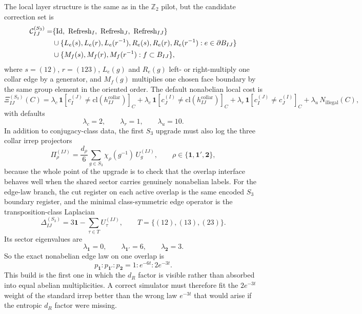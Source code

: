 \documentclass[11pt]{article}
\begin{document}
The local layer structure is the same as in the $\mathbb Z_2$ pilot, but the candidate correction
set is
\begin{align}
\mathcal C_{IJ}^{(S_3)}
=&
\{\mathrm{Id},\ \mathrm{Refresh}_I,\ \mathrm{Refresh}_J,\ \mathrm{Refresh}_{IJ}\}\notag\\
&\cup
\{L_e(s),L_e(r),L_e(r^{-1}),R_e(s),R_e(r),R_e(r^{-1}) : e\in \partial B_{IJ}\}\notag\\
&\cup
\{M_f(s),M_f(r),M_f(r^{-1}) : f\subset B_{IJ}\},
\end{align}
where $s=(12)$, $r=(123)$, $L_e(g)$ and $R_e(g)$ left- or right-multiply one collar edge by a
generator, and $M_f(g)$ multiplies one chosen face boundary by the same group element in the
oriented order. The default nonabelian local cost is
\begin{equation}
\Xi_{IJ}^{(S_3)}(C)
=
\lambda_c\,\mathbf 1[c_I^{(J)}\neq \mathrm{cl}(h_{IJ}^{\mathrm{collar}})]_C
+
\lambda_c\,\mathbf 1[c_J^{(I)}\neq \mathrm{cl}(h_{IJ}^{\mathrm{collar}})]_C
+
\lambda_r\,\mathbf 1[c_I^{(J)}\neq c_J^{(I)}]_C
+
\lambda_u\,N_{\mathrm{illegal}}(C),
\end{equation}
with defaults
\begin{equation}
\lambda_c=2,\qquad \lambda_r=1,\qquad \lambda_u=10.
\end{equation}
In addition to conjugacy-class data, the first $S_3$ upgrade must also log the three collar
irrep projectors
\begin{equation}
\Pi_{\rho}^{(IJ)}
=
\frac{d_{\rho}}{6}\sum_{g\in S_3}\chi_{\rho}(g^{-1})\,U_g^{(IJ)},
\qquad
\rho\in\{\mathbf 1,\mathbf 1',\mathbf 2\},
\end{equation}
because the whole point of the upgrade is to check that the overlap interface behaves well
when the shared sector carries genuinely nonabelian labels.
For the edge-law branch, the cut register on each active overlap is the same encoded $S_3$
boundary register, and the minimal class-symmetric edge operator is the transposition-class
Laplacian
\begin{equation}
\Delta_{IJ}^{(S_3)}
=
3\mathbf 1-\sum_{\tau\in T}U_{\tau}^{(IJ)},
\qquad
T=\{(12),(13),(23)\}.
\end{equation}
Its sector eigenvalues are
\begin{equation}
\lambda_{\mathbf 1}=0,
\qquad
\lambda_{\mathbf 1'}=6,
\qquad
\lambda_{\mathbf 2}=3.
\end{equation}
So the exact nonabelian edge law on one overlap is
\begin{equation}
p_{\mathbf 1}:p_{\mathbf 1'}:p_{\mathbf 2}
=
1:e^{-6t}:2e^{-3t}.
\end{equation}
This build is the first one in which the $d_R$ factor is visible rather than absorbed into equal
abelian multiplicities. A correct simulator must therefore fit the $2e^{-3t}$ weight of the
standard irrep better than the wrong law $e^{-3t}$ that would arise if the entropic $d_R$
factor were missing.
\end{document}
